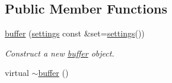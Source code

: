 \subsection*{Public Member Functions}
\begin{DoxyCompactItemize}
\item 
\hyperlink{classgfx_1_1buffer_a78a4247848a19c74a77410c92f0455d3}{buffer} (\hyperlink{classgfx_1_1buffer_1_1settings}{settings} const \&set=\hyperlink{classgfx_1_1buffer_1_1settings}{settings}())
\begin{DoxyCompactList}\small\item\em Construct a new \hyperlink{classgfx_1_1buffer}{buffer} object. \end{DoxyCompactList}\item 
\hypertarget{classgfx_1_1buffer_a2b267c96867b14486ee9200b758a3246}{virtual \hyperlink{classgfx_1_1buffer_a2b267c96867b14486ee9200b758a3246}{$\sim$buffer} ()}\label{classgfx_1_1buffer_a2b267c96867b14486ee9200b758a3246}


\end{DoxyCompactItemize}

